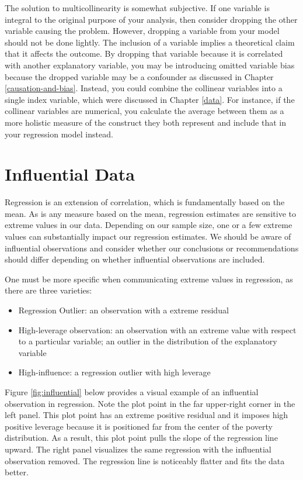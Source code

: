 \documentclass[
]{book}
\providecommand{\tightlist}{%
  \setlength{\itemsep}{0pt}\setlength{\parskip}{0pt}}
\begin{document}
The solution to multicollinearity is somewhat subjective. If one variable is integral to the original purpose of your analysis, then consider dropping the other variable causing the problem. However, dropping a variable from your model should not be done lightly. The inclusion of a variable implies a theoretical claim that it affects the outcome. By dropping that variable because it is correlated with another explanatory variable, you may be introducing omitted variable bias because the dropped variable may be a confounder as discussed in Chapter \ref{causation-and-bias}. Instead, you could combine the collinear variables into a single index variable, which were discussed in Chapter \ref{data}. For instance, if the collinear variables are numerical, you calculate the average between them as a more holistic measure of the construct they both represent and include that in your regression model instead.

\hypertarget{influential-data}{%
\section{Influential Data}\label{influential-data}}

Regression is an extension of correlation, which is fundamentally based on the mean. As is any measure based on the mean, regression estimates are sensitive to extreme values in our data. Depending on our sample size, one or a few extreme values can substantially impact our regression estimates. We should be aware of influential observations and consider whether our conclusions or recommendations should differ depending on whether influential observations are included.

One must be more specific when communicating extreme values in regression, as there are three varieties:

\begin{itemize}
\tightlist
\item
  Regression Outlier: an observation with a extreme residual
\item
  High-leverage observation: an observation with an extreme value with respect to a particular variable; an outlier in the distribution of the explanatory variable
\item
  High-influence: a regression outlier with high leverage
\end{itemize}

Figure \ref{fig:influential} below provides a visual example of an influential observation in regression. Note the plot point in the far upper-right corner in the left panel. This plot point has an extreme positive residual and it imposes high positive leverage because it is positioned far from the center of the poverty distribution. As a result, this plot point pulls the slope of the regression line upward. The right panel visualizes the same regression with the influential observation removed. The regression line is noticeably flatter and fits the data better.
\end{document}
